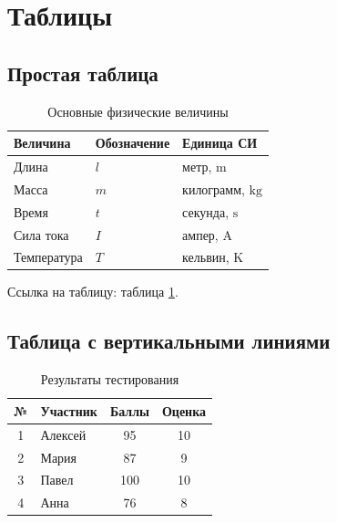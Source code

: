 \documentclass[12pt,a4paper]{article}
\theoremstyle{definition}
\theoremstyle{remark}
\begin{document}
\section{Таблицы}

\subsection{Простая таблица}

\begin{table}[H]
    \centering
    \caption{Основные физические величины}
    \label{tab:physics-values}

    \begin{tabular}{lll}
        \toprule
        \textbf{Величина} & \textbf{Обозначение} & \textbf{Единица СИ}\\
        \midrule
        Длина & $l$ & метр, $\si{\meter}$\\
        Масса & $m$ & килограмм, $\si{\kilogram}$\\
        Время & $t$ & секунда, $\si{\second}$\\
        Сила тока & $I$ & ампер, $\si{\ampere}$\\
        Температура & $T$ & кельвин, $\si{\kelvin}$\\
        \bottomrule
    \end{tabular}
\end{table}

Ссылка на таблицу: таблица \ref{tab:physics-values}.

\subsection{Таблица с вертикальными линиями}

\begin{table}[H]
    \centering
    \caption{Результаты тестирования}

    \begin{tabular}{|c|l|c|c|}
        \hline
        \textbf{№} &
        \textbf{Участник} &
        \textbf{Баллы} &
        \textbf{Оценка}\\
        \hline
        1 & Алексей & 95 & 10\\
        \hline
        2 & Мария & 87 & 9\\
        \hline
        3 & Павел & 100 & 10\\
        \hline
        4 & Анна & 76 & 8\\
        \hline
    \end{tabular}
\end{table}
\end{document}
